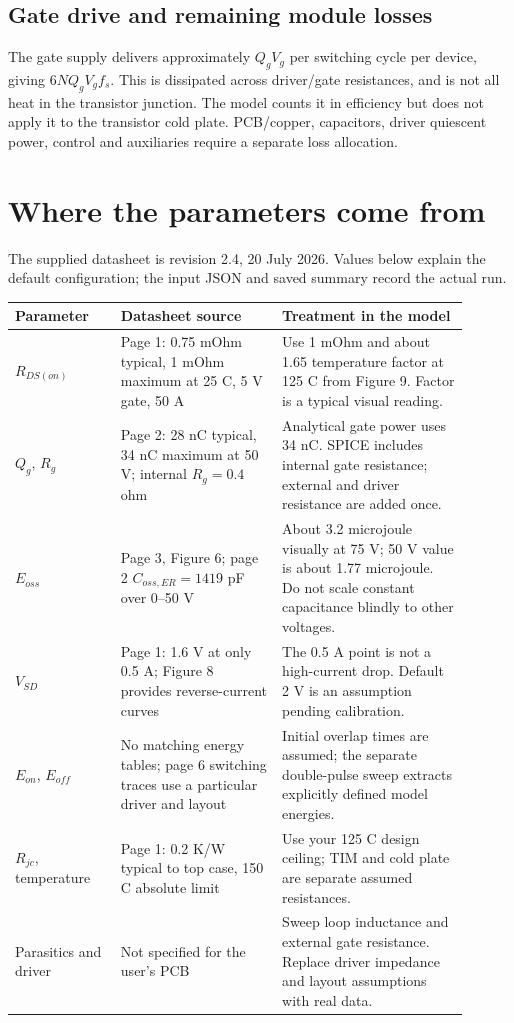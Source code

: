 \subsection{Gate drive and remaining module losses}
The gate supply delivers approximately $Q_gV_g$ per switching cycle per device,
giving $6NQ_gV_gf_s$. This is dissipated across driver/gate resistances, and is
not all heat in the transistor junction. The model counts it in efficiency but
does not apply it to the transistor cold plate. PCB/copper, capacitors, driver
quiescent power, control and auxiliaries require a separate loss allocation.

\section{Where the parameters come from}
The supplied datasheet is revision 2.4, 20 July 2026. Values below explain the
default configuration; the input JSON and saved summary record the actual run.
\begin{center}\small
\begin{tabular}{p{0.21\linewidth}p{0.32\linewidth}p{0.37\linewidth}}
Parameter & Datasheet source & Treatment in the model \\
\hline
$R_{DS(on)}$ & Page 1: 0.75 mOhm typical, 1 mOhm maximum at 25 C, 5 V gate, 50 A &
Use 1 mOhm and about 1.65 temperature factor at 125 C from Figure 9. Factor is a typical visual reading. \\
$Q_g$, $R_g$ & Page 2: 28 nC typical, 34 nC maximum at 50 V; internal $R_g=0.4$ ohm &
Analytical gate power uses 34 nC. SPICE includes internal gate resistance; external and driver resistance are added once. \\
$E_{oss}$ & Page 3, Figure 6; page 2 $C_{oss,ER}=1419$ pF over 0--50 V &
About 3.2 microjoule visually at 75 V; 50 V value is about 1.77 microjoule. Do not scale constant capacitance blindly to other voltages. \\
$V_{SD}$ & Page 1: 1.6 V at only 0.5 A; Figure 8 provides reverse-current curves &
The 0.5 A point is not a high-current drop. Default 2 V is an assumption pending calibration. \\
$E_{on}$, $E_{off}$ & No matching energy tables; page 6 switching traces use a particular driver and layout &
Initial overlap times are assumed; the separate double-pulse sweep extracts explicitly defined model energies. \\
$R_{jc}$, temperature & Page 1: 0.2 K/W typical to top case, 150 C absolute limit &
Use your 125 C design ceiling; TIM and cold plate are separate assumed resistances. \\
Parasitics and driver & Not specified for the user's PCB &
Sweep loop inductance and external gate resistance. Replace driver impedance and layout assumptions with real data. \\
\end{tabular}
\end{center}
\clearpage
